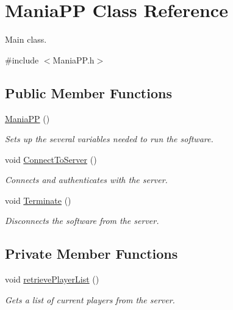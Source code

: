 \hypertarget{classManiaPP}{\section{Mania\-P\-P Class Reference}
\label{classManiaPP}
}


Main class.  




{\ttfamily \#include $<$Mania\-P\-P.\-h$>$}

\subsection*{Public Member Functions}
\begin{DoxyCompactItemize}
\item 
\hyperlink{classManiaPP_ae56f6623dc89f2c0b75bec631cfc2d19}{Mania\-P\-P} ()
\begin{DoxyCompactList}\small\item\em Sets up the several variables needed to run the software. \end{DoxyCompactList}\item 
void \hyperlink{classManiaPP_adb62da8dda48cf573666e82e6ecb8572}{Connect\-To\-Server} ()
\begin{DoxyCompactList}\small\item\em Connects and authenticates with the server. \end{DoxyCompactList}\item 
void \hyperlink{classManiaPP_a87fd53fffe4a1840834a90ab575f5ce6}{Terminate} ()
\begin{DoxyCompactList}\small\item\em Disconnects the software from the server. \end{DoxyCompactList}\end{DoxyCompactItemize}
\subsection*{Private Member Functions}
\begin{DoxyCompactItemize}
\item 
void \hyperlink{classManiaPP_aede94c0b982250de19186d447542e479}{retrieve\-Player\-List} ()
\begin{DoxyCompactList}\small\item\em Gets a list of current players from the server. \end{DoxyCompactList}\end{DoxyCompactItemize}
